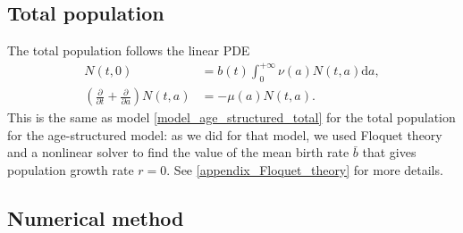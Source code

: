 \documentclass[USenglish]{article}
\newcommand{\md}{\mathrm{d}}
\begin{document}
\subsection{Total population}

The total population follows the linear PDE
\begin{subequations}
  \begin{align}
    N(t, 0) &=
    b(t) \int_0^{+\infty} \nu(a) N(t, a) \md a,
    \\
    \left(\frac{\partial}{\partial t}
      + \frac{\partial}{\partial a}\right)
    N(t, a) &=
    - \mu(a) N(t, a).
  \end{align}
\end{subequations}
This is the same as model \eqref{model_age_structured_total} for the
total population for the age-structured model: as we did for that
model, we used Floquet theory and a nonlinear solver to find the value
of the mean birth rate $\bar{b}$ that gives population growth rate
$r = 0$.  See \autoref{appendix_Floquet_theory} for more details.


\subsection{Numerical method}
\end{document}
